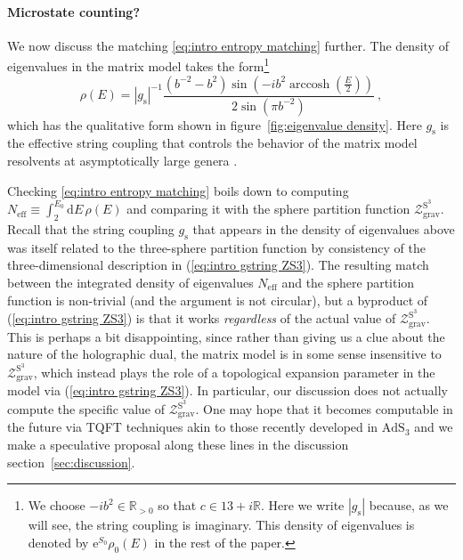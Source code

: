 \documentclass[12pt,a4paper]{article}
\newcommand\RR{\mathbb{R}}
\renewcommand\d{\text{d}}
\begin{document}
\paragraph{Microstate counting?} We now discuss the matching \eqref{eq:intro entropy matching} further. The density of eigenvalues in the matrix model takes the form\footnote{We choose $-i b^2 \in \RR_{>0}$ so that $c \in 13+i \RR$. Here we write $|g_{\text{s}}|$ because, as we will see, the string coupling is imaginary. This density of eigenvalues is denoted by $\mathrm{e}^{S_0} \rho_0(E)$ in the rest of the paper.}
\begin{equation}\label{eq: intro eigenvalue distribution}
    \rho(E) = |g_{\text{s}}|^{-1}\frac{ (b^{-2}-b^2)\sin \left(- ib^2 \mathop{\text{arccosh}}\left(\frac{E}{2}\right)\right)}{2 \sin(\pi b^{-2})} ~,
\end{equation}
which has the qualitative form shown in figure~\ref{fig:eigenvalue density}. Here $g_{\text{s}}$ is the effective string coupling that controls the behavior of the matrix model resolvents at asymptotically large genera \cite{paper3}.

Checking \eqref{eq:intro entropy matching} boils down to computing $N_{\text{eff}} \equiv \int_2^{E_0} \d E \, \rho(E)$ and comparing it with the sphere partition function $\mathcal{Z}_\text{grav}^{\text{S}^3}$. Recall that the string coupling $g_{\text{s}}$ that appears in the density of eigenvalues above was itself related to the three-sphere partition function by consistency of the three-dimensional description in (\ref{eq:intro gstring ZS3}). The resulting match between the integrated density of eigenvalues $N_{\text{eff}}$ and the sphere partition function is non-trivial (and the argument is not circular), but a byproduct of (\ref{eq:intro gstring ZS3}) is that it works \emph{regardless} of the actual value of $\mathcal{Z}_\text{grav}^{\text{S}^3}$. 
This is perhaps a bit disappointing, since rather than giving us a clue about the nature of the holographic dual, the matrix model is in some sense insensitive to $\mathcal{Z}_\text{grav}^{\text{S}^3}$, which instead plays the role of a topological expansion parameter in the model via (\ref{eq:intro gstring ZS3}).
In particular, our discussion does not actually compute the specific value of $\mathcal{Z}_\text{grav}^{\text{S}^3}$. One may hope that it becomes computable in the future via TQFT techniques akin to those recently developed in $\text{AdS}_3$ \cite{Collier:2023fwi} and we make a speculative proposal along these lines in the discussion section~\ref{sec:discussion}.
\end{document}
